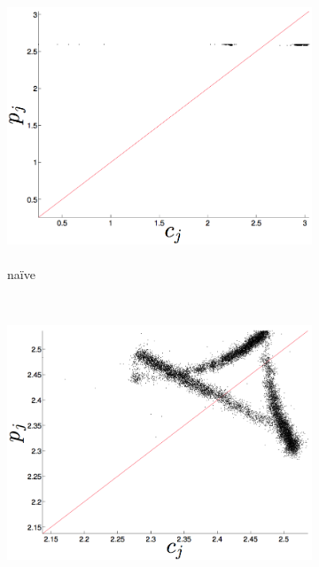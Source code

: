 \begin{figure}[htbp]
\begin{subfigure}{0.32\columnwidth}
    \includegraphics[width=\columnwidth]{figs/svdfiveMeanForecast.png}
    \caption{\svdfive\\ na\"ive }
    \label{fig:gccMEAN}
  \end{subfigure}%
  \\
    \begin{subfigure}{0.32\columnwidth}
    \includegraphics[width=\columnwidth]{figs/colARIMAForecast.png}
    

\end{subfigure}
\end{figure}
